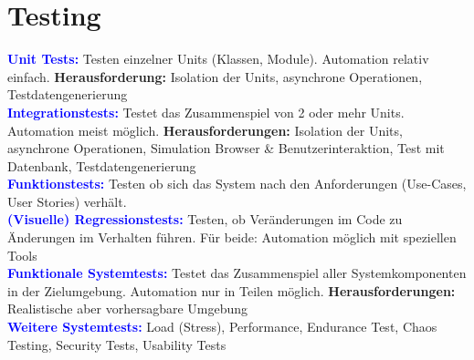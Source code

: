 
\section{Testing}
\textbf{\textcolor{blue}{Unit Tests:}} Testen einzelner Units (Klassen, Module). Automation relativ einfach. \textbf{Herausforderung:} Isolation der Units, asynchrone Operationen, Testdatengenerierung\\
\textbf{\textcolor{blue}{Integrationstests:}} Testet das Zusammenspiel von 2 oder mehr Units. Automation meist möglich. \textbf{Herausforderungen:} Isolation der Units, asynchrone Operationen, Simulation Browser \& Benutzerinteraktion, Test mit Datenbank, Testdatengenerierung\\
\textbf{\textcolor{blue}{Funktionstests:}} Testen ob sich das System nach den Anforderungen (Use-Cases, User Stories) verhält.\\
\textbf{\textcolor{blue}{(Visuelle) Regressionstests:}}
Testen, ob Veränderungen im Code zu Änderungen im Verhalten führen. Für beide: Automation möglich mit speziellen Tools\\
\textbf{\textcolor{blue}{Funktionale Systemtests:}} Testet das Zusammenspiel aller Systemkomponenten in der Zielumgebung. Automation nur in Teilen möglich. \textbf{Herausforderungen:} Realistische aber vorhersagbare Umgebung\\
\textbf{\textcolor{blue}{Weitere Systemtests:}} Load (Stress), Performance, Endurance Test, Chaos Testing, Security Tests, Usability Tests
